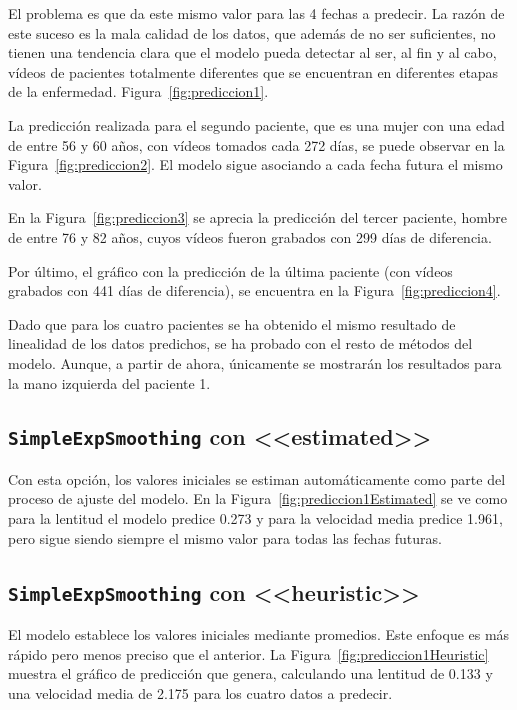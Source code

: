 El problema es que da este mismo valor para las 4 fechas a predecir. La razón de este suceso es la mala calidad de los datos, que además de no ser suficientes, no tienen una tendencia clara que el modelo pueda detectar al ser, al fin y al cabo, vídeos de pacientes totalmente diferentes que se encuentran en diferentes etapas de la enfermedad.
Figura~\ref{fig:prediccion1}.

La predicción realizada para el segundo paciente, que es una mujer con una edad de entre 56 y 60 años, con vídeos tomados cada 272 días, se puede observar en la Figura~\ref{fig:prediccion2}. El modelo sigue asociando a cada fecha futura el mismo valor.

En la Figura~\ref{fig:prediccion3} se aprecia la predicción del tercer paciente, hombre de entre 76 y 82 años, cuyos vídeos fueron grabados con 299 días de diferencia.

Por último, el gráfico con la predicción de la última paciente (con vídeos grabados con 441 días de diferencia), se encuentra en la Figura~\ref{fig:prediccion4}.

Dado que para los cuatro pacientes se ha obtenido el mismo resultado de linealidad de los datos predichos, se ha probado con el resto de métodos del modelo. Aunque, a partir de ahora, únicamente se mostrarán los resultados para la mano izquierda del paciente 1.


\subsection{\texttt{SimpleExpSmoothing} con <<estimated>>}
Con esta opción, los valores iniciales se estiman automáticamente como parte del proceso de ajuste del modelo. 
En la Figura~\ref{fig:prediccion1Estimated} se ve como para la lentitud el modelo predice 0.273 y para la velocidad media predice 1.961, pero sigue siendo siempre el mismo valor para todas las fechas futuras.


\subsection{\texttt{SimpleExpSmoothing} con <<heuristic>>}
El modelo establece los valores iniciales mediante promedios. Este enfoque es más rápido pero menos preciso que el anterior.
La Figura~\ref{fig:prediccion1Heuristic} muestra el gráfico de predicción que genera, calculando una lentitud de 0.133 y una velocidad media de 2.175 para los cuatro datos a predecir.


